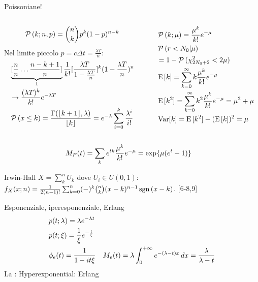 \documentclass[asd-beamer.tex]{subfiles}
\begin{document}
\begin{frame}{Poissoniane!}
\begin{columns}[T]
	\begin{column}{0.5\textwidth}
\[\operatorname{\mathcal{P}}{(k;n,p)}=\binom{n}{k}p^k(1-p)^{n-k}\]
Nel limite piccolo $p=c\Delta t=\frac{\lambda T}{n}$:
\begin{align*}
&\underbrace{[\frac{n}{n}\ldots\frac{n-k+1}{n}]}_{1}\frac{1}{k!}[\frac{\lambda T}{1-\frac{\lambda T}{n}}]^k(1-\frac{\lambda T}{n})^n\\
&\to\frac{(\lambda T)^k}{k!}e^{-\lambda T}\\
&\operatorname{\mathcal{P}}{(x\leq k)}=\frac{\Gamma(\lfloor k+1\rfloor,\lambda)}{\lfloor k\rfloor}=e^{-\lambda}\sum_{i=0}^k\frac{\lambda^i}{i!}
\end{align*}
	\end{column}
	\begin{column}{0.5\textwidth}
		\begin{align*}
&\operatorname{\mathcal{P}}{(k;\mu)}=\frac{\mu^k}{k!}e^{-\mu}\\
&\operatorname{\mathcal{P}}{(r<N_0|\mu)}\\
&=1-\operatorname{\mathcal{P}}{(\chi^2_{2N_0+2}<2\mu)}\\
&\operatorname{E}{[k]}=\sum_{k=0}^{\infty}k\frac{\mu^k}{k!}e^{-\mu}\\
&\operatorname{E}{[k^2]}=\sum_{k=0}^{\infty}k^2\frac{\mu^k}{k!}e^{-\mu}=\mu^2+\mu\\
&\operatorname{Var}[k]=\operatorname{E}{[k^2]}-(\operatorname{E}{[k]})^2=\mu
\end{align*}
	\end{column}
\end{columns}
\begin{align*}
&M_P(t)=\sum_ke^{tk}\frac{\mu^k}{k!}e^{-\mu}=\text{exp}\{\mu(e^{t}-1)\}
\end{align*}
\end{frame}

\begin{frame}{Irwin-Hall}
$X=\sum_k^nU_k$ dove $U_i\in U(0,1)$: $f_X(x;n)=\frac{1}{2(n-1)!}\sum_{k=0}^n(-)^k\binom{n}{k}(x-k)^{n-1}\operatorname{sgn}{(x-k)}$.
[6-8,9]
    
\end{frame}

\begin{frame}{Esponenziale, iperesponenziale, Erlang}
\begin{align*}
&p(t;\lambda)=\lambda e^{-\lambda t}\\
&p(t;\xi)=\frac{1}{\xi}e^{-\frac{t}{\xi}}\\
&\phi_e(t)=\frac{1}{1-it\xi}
&M_e(t)=\lambda\int_{0}^{+\infty}{}e^{-(\lambda-t)x}\,dx=\frac{\lambda}{\lambda-t}
\end{align*}
La : 
Hyperexponential:
Erlang
\end{frame}
\end{document}
